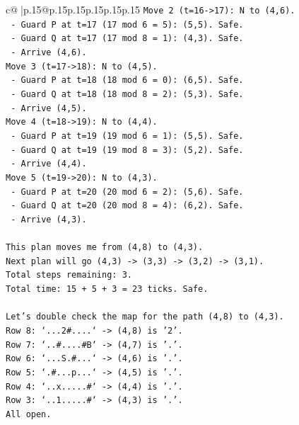 \documentclass{article}
\begin{document}
{\begin{supertabular}{c@{$\;$}|p{.15\linewidth}@{}p{.15\linewidth}p{.15\linewidth}p{.15\linewidth}p{.15\linewidth}p{.15\linewidth}}
{{{\texttt{Move 2 (t=16{-}>17): N to (4,6).} \\
\texttt{  {-} Guard P at t=17 (17 mod 6 = 5): (5,5). Safe.} \\
\texttt{  {-} Guard Q at t=17 (17 mod 8 = 1): (4,3). Safe.} \\
\texttt{  {-} Arrive (4,6).} \\
\texttt{Move 3 (t=17{-}>18): N to (4,5).} \\
\texttt{  {-} Guard P at t=18 (18 mod 6 = 0): (6,5). Safe.} \\
\texttt{  {-} Guard Q at t=18 (18 mod 8 = 2): (5,3). Safe.} \\
\texttt{  {-} Arrive (4,5).} \\
\texttt{Move 4 (t=18{-}>19): N to (4,4).} \\
\texttt{  {-} Guard P at t=19 (19 mod 6 = 1): (5,5). Safe.} \\
\texttt{  {-} Guard Q at t=19 (19 mod 8 = 3): (5,2). Safe.} \\
\texttt{  {-} Arrive (4,4).} \\
\texttt{Move 5 (t=19{-}>20): N to (4,3).} \\
\texttt{  {-} Guard P at t=20 (20 mod 6 = 2): (5,6). Safe.} \\
\texttt{  {-} Guard Q at t=20 (20 mod 8 = 4): (6,2). Safe.} \\
\texttt{  {-} Arrive (4,3).} \\
\\ 
\texttt{This plan moves me from (4,8) to (4,3).} \\
\texttt{Next plan will go (4,3) {-}> (3,3) {-}> (3,2) {-}> (3,1).} \\
\texttt{Total steps remaining: 3.} \\
\texttt{Total time: 15 + 5 + 3 = 23 ticks. Safe.} \\
\\ 
\texttt{Let's double check the map for the path (4,8) to (4,3).} \\
\texttt{Row 8: `...2\#....` {-}> (4,8) is '2'.} \\
\texttt{Row 7: `..\#....\#B` {-}> (4,7) is '.'.} \\
\texttt{Row 6: `...S.\#...` {-}> (4,6) is '.'.} \\
\texttt{Row 5: `.\#...p...` {-}> (4,5) is '.'.} \\
\texttt{Row 4: `..x.....\#` {-}> (4,4) is '.'.} \\
\texttt{Row 3: `..1.....\#` {-}> (4,3) is '.'.} \\
\texttt{All open.} \\
}}}
\end{supertabular}}
\end{document}
